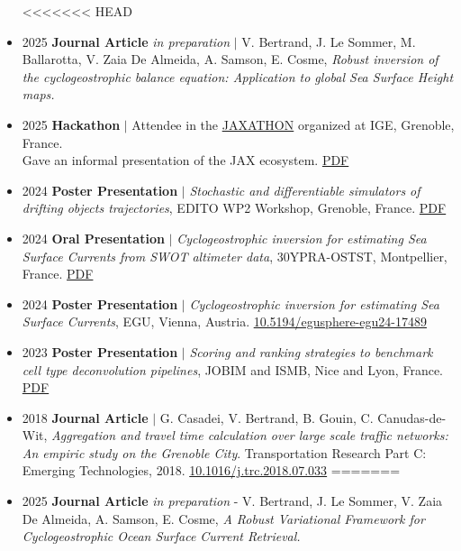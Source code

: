 \documentclass{article}
\begin{document}
\begin{itemize}
<<<<<<< HEAD
    \item[] 2025 \tabto{2cm} \textbf{Journal Article} \textit{in preparation} $\vert$ V. Bertrand, J. Le Sommer, M. Ballarotta, V. Zaia De Almeida, A. \tabto{2cm} Samson, E. Cosme, \textit{Robust inversion of the cyclogeostrophic balance equation: Application to global Sea \tabto{2cm} Surface Height maps.}

    \item[] 2025 \tabto{2cm} \textbf{Hackathon} $\vert$ Attendee in the \href{https://github.com/Diff4Earth/ige-jaxathon-2025}{JAXATHON} organized at IGE, Grenoble, France. \\[.1 cm]
        \tabto{2cm} Gave an informal presentation of the JAX ecosystem. \href{https://vadmbertr.github.io/material/presentations/2025-03-jaxathon.pdf}{PDF}

    \item[] 2024 \tabto{2cm} \textbf{Poster Presentation} $\vert$ \textit{Stochastic and differentiable simulators of drifting objects trajectories}, EDITO \tabto{2cm} WP2 Workshop, Grenoble, France. \href{https://vadmbertr.github.io/material/posters/2024-10_EDITO_Bertrand.pdf}{PDF}
    
    \item[] 2024 \tabto{2cm} \textbf{Oral Presentation} $\vert$ \textit{Cyclogeostrophic inversion for estimating Sea Surface Currents from SWOT \tabto{2cm} altimeter data}, 30YPRA-OSTST, Montpellier, France. \href{https://vadmbertr.github.io/material/presentations/2.4-5-Bertrand.pdf}{PDF}
    
    \item[] 2024 \tabto{2cm} \textbf{Poster Presentation} $\vert$ \textit{Cyclogeostrophic inversion for estimating Sea Surface Currents}, EGU, Vienna, \tabto{2cm} Austria. \href{https://doi.org/10.5194/egusphere-egu24-17489}{10.5194/egusphere-egu24-17489}
    
    \item[] 2023 \tabto{2cm} \textbf{Poster Presentation} $\vert$ \textit{Scoring and ranking strategies to benchmark cell type deconvolution pipelines}, \tabto{2cm} JOBIM and ISMB, Nice and Lyon, France. \href{https://vadmbertr.github.io/material/posters/poster_jobim_ismb.pdf}{PDF}
    
    \item[] 2018 \tabto{2cm} \textbf{Journal Article} $\vert$ G. Casadei, V. Bertrand, B. Gouin, C. Canudas-de-Wit, \textit{Aggregation and travel time \tabto{2cm} calculation over large scale traffic networks: An empiric study on the Grenoble City}. Transportation \tabto{2cm} Research Part C: Emerging Technologies, 2018. \href{https://doi.org/10.1016/j.trc.2018.07.033}{10.1016/j.trc.2018.07.033}
=======
    \item[] 2025 \tabto{2cm} \textbf{Journal Article} \textit{in preparation} - V. Bertrand, J. Le Sommer, V. Zaia De Almeida, A. \tabto{2cm} Samson, E. Cosme, \textit{A Robust Variational Framework for Cyclogeostrophic Ocean Surface Current Retrieval.}


\end{itemize}
\end{document}
